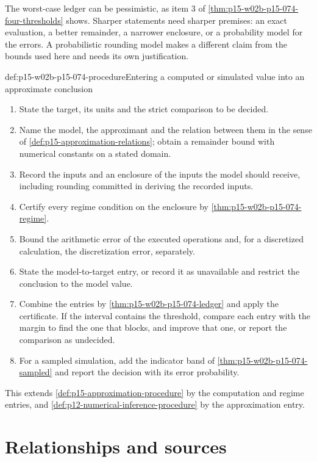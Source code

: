 The worst-case ledger can be pessimistic, as item 3 of
\cref{thm:p15-w02b-p15-074-four-thresholds} shows. Sharper statements
need sharper premises: an exact evaluation, a better remainder, a narrower
enclosure, or a probability model for the errors. A probabilistic rounding
model makes a different claim from the bounds used here and needs its own
justification.

\begin{hbmethod}{def:p15-w02b-p15-074-procedure}{Entering a computed or simulated value into an approximate conclusion}
\begin{enumerate}
\item State the target, its units and the strict comparison to be decided.
\item Name the model, the approximant and the relation between them in the
sense of \cref{def:p15-approximation-relations}; obtain a remainder bound
with numerical constants on a stated domain.
\item Record the inputs and an enclosure of the inputs the model should
receive, including rounding committed in deriving the recorded inputs.
\item Certify every regime condition on the enclosure by
\cref{thm:p15-w02b-p15-074-regime}.
\item Bound the arithmetic error of the executed operations and, for a
discretized calculation, the discretization error, separately.
\item State the model-to-target entry, or record it as unavailable and
restrict the conclusion to the model value.
\item Combine the entries by \cref{thm:p15-w02b-p15-074-ledger} and apply
the certificate. If the interval contains the threshold, compare each
entry with the margin to find the one that blocks, and improve that one,
or report the comparison as undecided.
\item For a sampled simulation, add the indicator band of
\cref{thm:p15-w02b-p15-074-sampled} and report the decision with its
error probability.
\end{enumerate}
This extends \cref{def:p15-approximation-procedure} by the computation and
regime entries, and \cref{def:p12-numerical-inference-procedure} by the
approximation entry.
\end{hbmethod}

\section{Relationships and sources}
\label{sec:p15-w02b-p15-074-relations}

